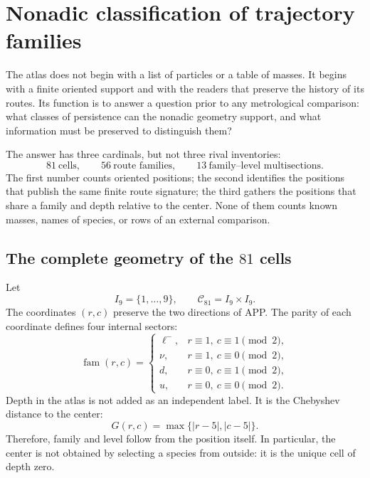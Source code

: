 \chapter[Nonadic classification of families]{Nonadic classification of trajectory families}
\label{chap:atlas-genealogia-masas}

The atlas does not begin with a list of particles or a table of masses.
It begins with a finite oriented support and with the readers that preserve the
history of its routes.  Its function is to answer a question prior to
any metrological comparison: what classes of persistence can the
nonadic geometry support, and what information must be preserved to distinguish them?

The answer has three cardinals, but not three rival inventories:
\[
 81\ \text{cells},\qquad
 56\ \text{route families},\qquad
 13\ \text{family--level multisections}.
\]
The first number counts oriented positions; the second identifies the
positions that publish the same finite route signature; the third gathers the
positions that share a family and depth relative to the center. None
of them counts known masses, names of species, or rows of an
external comparison.

\section{The complete geometry of the \(81\) cells}

Let
\[
 I_9=\{1,\ldots,9\},
 \qquad
 \mathcal C_{81}=I_9\times I_9.
\]
The coordinates \((r,c)\) preserve the two directions of APP\@. The parity
of each coordinate defines four internal sectors:
\[
 \operatorname{fam}(r,c)=
 \begin{cases}
  \ell^- ,& r\equiv1,\ c\equiv1\pmod2,\\
  \nu ,& r\equiv1,\ c\equiv0\pmod2,\\
  d ,& r\equiv0,\ c\equiv1\pmod2,\\
  u ,& r\equiv0,\ c\equiv0\pmod2.
 \end{cases}
 \tag{A1}\label{eq:familias-paridad-atlas}
\]
Depth in the atlas is not added as an independent label.  It is the
Chebyshev distance to the center:
\[
 G(r,c)=\max\{|r-5|,|c-5|\}.
 \tag{A2}\label{eq:generacion-chebyshev-atlas}
\]
Therefore, family and level follow from the position itself.  In particular,
the center is not obtained by selecting a species from outside: it is the unique
cell of depth zero.


